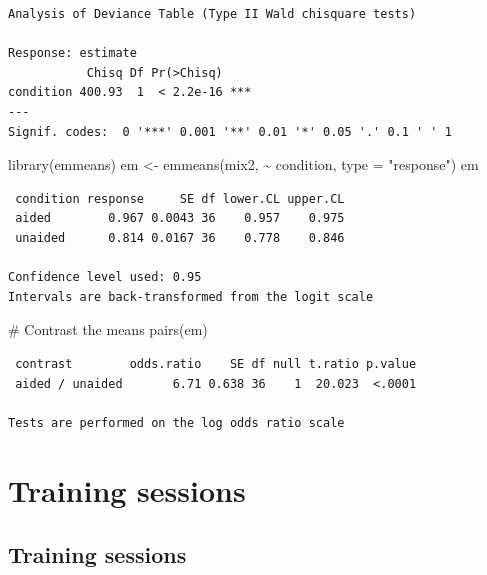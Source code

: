 \documentclass[
  letterpaper,
]{book}
\newenvironment{Shaded}{\begin{snugshade}}{\end{snugshade}}
\newcommand{\AttributeTok}[1]{\textcolor[rgb]{0.40,0.45,0.13}{#1}}
\newcommand{\CommentTok}[1]{\textcolor[rgb]{0.37,0.37,0.37}{#1}}
\newcommand{\FunctionTok}[1]{\textcolor[rgb]{0.28,0.35,0.67}{#1}}
\newcommand{\NormalTok}[1]{\textcolor[rgb]{0.00,0.23,0.31}{#1}}
\newcommand{\OtherTok}[1]{\textcolor[rgb]{0.00,0.23,0.31}{#1}}
\newcommand{\SpecialCharTok}[1]{\textcolor[rgb]{0.37,0.37,0.37}{#1}}
\newcommand{\StringTok}[1]{\textcolor[rgb]{0.13,0.47,0.30}{#1}}
\begin{document}
\begin{verbatim}
Analysis of Deviance Table (Type II Wald chisquare tests)

Response: estimate
           Chisq Df Pr(>Chisq)    
condition 400.93  1  < 2.2e-16 ***
---
Signif. codes:  0 '***' 0.001 '**' 0.01 '*' 0.05 '.' 0.1 ' ' 1
\end{verbatim}

\begin{Shaded}
\begin{Highlighting}[]
\FunctionTok{library}\NormalTok{(emmeans)}
\NormalTok{em }\OtherTok{\textless{}{-}} \FunctionTok{emmeans}\NormalTok{(mix2, }\SpecialCharTok{\textasciitilde{}}\NormalTok{ condition, }\AttributeTok{type =} \StringTok{"response"}\NormalTok{)}
\NormalTok{em}
\end{Highlighting}
\end{Shaded}

\begin{verbatim}
 condition response     SE df lower.CL upper.CL
 aided        0.967 0.0043 36    0.957    0.975
 unaided      0.814 0.0167 36    0.778    0.846

Confidence level used: 0.95 
Intervals are back-transformed from the logit scale 
\end{verbatim}

\begin{Shaded}
\begin{Highlighting}[]
\CommentTok{\# Contrast the means}
\FunctionTok{pairs}\NormalTok{(em)}
\end{Highlighting}
\end{Shaded}

\begin{verbatim}
 contrast        odds.ratio    SE df null t.ratio p.value
 aided / unaided       6.71 0.638 36    1  20.023  <.0001

Tests are performed on the log odds ratio scale 
\end{verbatim}

\hypertarget{training-sessions}{%
\chapter{Training sessions}\label{training-sessions}}

\hypertarget{training-sessions-1}{%
\section{Training sessions}\label{training-sessions-1}}
\end{document}
